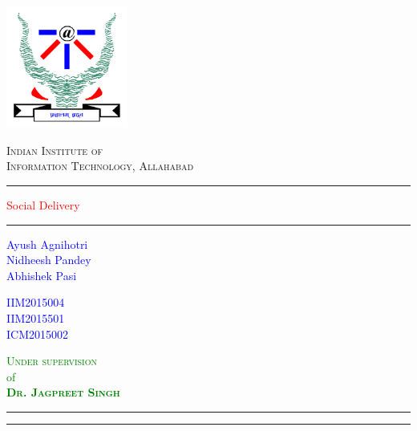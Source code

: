 \documentclass{report}
\begin{document}
 

\begin{titlepage}
	\centering
	\includegraphics[width=4cm]{logo.png}\\[.5cm]
	{\scshape\LARGE Indian Institute of \\Information Technology, Allahabad \par}
	\vspace{1cm}
	\rule{\textwidth}{2pt}	
	\vspace{0.1\textheight}
		
	\textcolor{Red}{ 
		{\fontsize{35}{42}\selectfont Social Delivery}\\[0.5\baselineskip]
	}
	
	\vspace{0.185\textheight} 
	
	\rule{0.3\textwidth}{0.4pt} 
	\begin{multicols}{3} 
	\textcolor{Blue}{
		\begin{flushleft} 
		{\large Ayush Agnihotri}\\[5pt] 
		{\large Nidheesh Pandey}\\[5pt]
		{\large Abhishek Pasi}\\[5pt]
		\end{flushleft}
		}
		\columnbreak
		 
	\textcolor{Blue}{
		\begin{flushleft} 
		{\large IIM2015004}\\[5pt] 
		{\large IIM2015501}\\[5pt]
		{\large ICM2015002}\\[5pt]
		\end{flushleft}
		}
		\columnbreak

	\textcolor{Green}{
		\begin{flushright}
		{\Large \textsc{Under supervision}}\\
		{\large of}\\
		{\Large \textsc{\textbf{Dr. Jagpreet Singh}}}
		\end{flushright}
		}
	\end{multicols}
	\vspace{0.065\textheight} 
	
\hfill


	\rule{\textwidth}{0.4pt} %
	
	\vspace{2pt}\vspace{-\baselineskip} %
	
	\rule{\textwidth}{2pt} %
	
\end{titlepage}
\pagebreak
\end{document}
